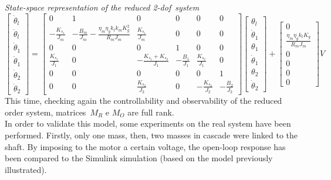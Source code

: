\noindent \textit{State-space representation of the reduced \acrshort{2-dof}\ system}
\begin{equation}
	\begin{bmatrix}
		\dot{\theta}_l \\
		\ddot{\theta}_l \\
		\dot{\theta}_1 \\
		\ddot{\theta}_1 \\
		\dot{\theta}_2 \\
		\ddot{\theta}_2
	\end{bmatrix}
	=
	\begin{bmatrix}
		0 &1 & 0 & 0 & 0 & 0 \\
		-\frac{K_{s_1}}{J_m} & -\frac{B_m}{J_m}-\frac{\eta_m \eta_g k_t k_m K^2_g}{R_m J_m}  & \frac{K_{s_1}}{J_m} & 0 & 0 & 0 \\
		0 & 0 & 0 & 1 & 0 & 0 \\
		\frac{K_{s_1}}{J_1} & 0 & -\frac{K_{s_1}+K_{s_2}}{J_1} & -\frac{B_1}{J_1} & \frac{K_{s_2}}{J_1} & 0 \\
		0 & 0 & 0 & 0 & 0 & 1 \\
		0 & 0 & \frac{K_{s_2}}{J_2} & 0 & -\frac{K_{s_2}}{J_2} & -\frac{B_2}{J_2}
	\end{bmatrix}
	\begin{bmatrix}
		\theta_l \\
		\dot{\theta}_1 \\
		\theta_1 \\
		\dot{\theta}_1 \\
		\theta_2 \\
		\dot{\theta}_2
	\end{bmatrix}
	+
	\begin{bmatrix}
		0 \\
		\frac{\eta_m \eta_g k_t K_g}{R_m J_m} \\
		0 \\
		0 \\
		0 \\
		0
	\end{bmatrix}
	V
\end{equation}
This time, checking again the controllability and observability of the reduced order system, matrices~$M_R$ e $M_O$ are full rank. \\

In order to validate this model, some experiments on the real system have been performed. Firstly, only one mass, then, two masses in cascade were linked to the shaft. By imposing to the motor a certain voltage, the open-loop response has been compared to the Simulink simulation (based on the model previously illustrated).

